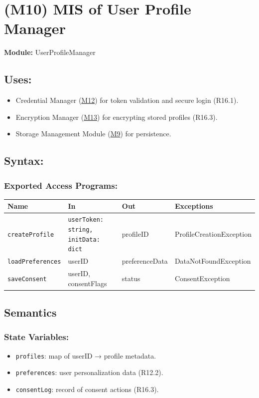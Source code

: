 \documentclass[12pt, titlepage]{article}
\begin{document}
\section{(M10) MIS of User Profile Manager} \label{M10}

\textbf{Module:} UserProfileManager

\subsection{Uses:}
\begin{itemize}
\item Credential Manager (\hyperref[M12]{M12}) for token validation and secure login (R16.1).
\item Encryption Manager (\hyperref[M13]{M13}) for encrypting stored profiles (R16.3).
\item Storage Management Module (\hyperref[M9]{M9}) for persistence.
\end{itemize}

\subsection{Syntax:}

\subsubsection{Exported Access Programs:}

\begin{tabular}{|l|l|l|l|}
\hline
\textbf{Name} & \textbf{In} & \textbf{Out} & \textbf{Exceptions} \\ \hline
\texttt{createProfile} & \texttt{userToken: string, initData: dict} & profileID & ProfileCreationException \\ 
\texttt{loadPreferences} & userID & preferenceData & DataNotFoundException \\ 
\texttt{saveConsent} & userID, consentFlags & status & ConsentException \\ \hline
\end{tabular}

\subsection{Semantics}

\subsubsection{State Variables:}
\begin{itemize}
\item \texttt{profiles}: map of userID → profile metadata.
\item \texttt{preferences}: user personalization data (R12.2).
\item \texttt{consentLog}: record of consent actions (R16.3).
\end{itemize}
\end{document}
